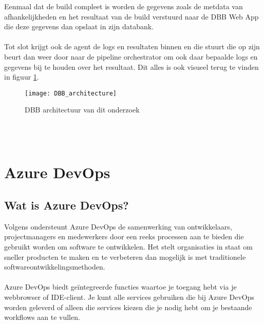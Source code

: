 Eenmaal dat de build compleet is worden de gegevens zoals de metdata van afhankelijkheden en het resultaat van de build verstuurd naar de DBB Web App die deze gegevens dan opslaat in zijn databank.
\\ \\
Tot slot krijgt ook de agent de logs en resultaten binnen en die stuurt die op zijn beurt dan weer door naar de pipeline orchestrator om ook daar bepaalde logs en gegevens bij te houden over het resultaat. Dit alles is ook visueel terug te vinden in figuur \ref{fig:dbb architectuur}.
\begin{figure}[h]
    \centering
    \texttt{[image: DBB\_architecture]}
    \caption{DBB architectuur van dit onderzoek}
    \label{fig:dbb architectuur}
\end{figure}
\\ \\
\section{Azure DevOps}
\label{sec:azure devops}
\subsection{Wat is Azure DevOps?}
Volgens \textcite{Microsoft2024} ondersteunt Azure DevOps de samenwerking van ontwikkelaars, projectmanagers en medewerkers door een reeks processen aan te bieden die gebruikt worden om software te ontwikkelen. Het stelt organisaties in staat om sneller producten te maken en te verbeteren dan mogelijk is met traditionele softwareontwikkelingsmethoden.
\\ \\
Azure DevOps biedt geïntegreerde functies waartoe je toegang hebt via je webbrowser of IDE-client. Je kunt alle services gebruiken die bij Azure DevOps worden geleverd of alleen die services kiezen die je nodig hebt om je bestaande workflows aan te vullen.
\\ \\
